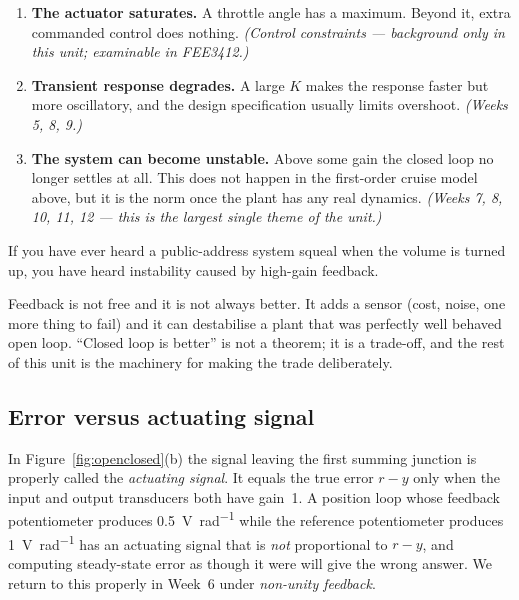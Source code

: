 \documentclass[11pt,a4paper]{article}
\begin{document}
\begin{enumerate}[leftmargin=*]
\item \textbf{The actuator saturates.} A throttle angle has a maximum. Beyond
      it, extra commanded control does nothing. \emph{(Control constraints ---
      background only in this unit; examinable in FEE3412.)}
\item \textbf{Transient response degrades.} A large $K$ makes the response
      faster but more oscillatory, and the design specification usually limits
      overshoot. \emph{(Weeks 5, 8, 9.)}
\item \textbf{The system can become unstable.} Above some gain the closed loop
      no longer settles at all. This does not happen in the first-order cruise
      model above, but it is the norm once the plant has any real dynamics.
      \emph{(Weeks 7, 8, 10, 11, 12 --- this is the largest single theme of the
      unit.)}
\end{enumerate}

If you have ever heard a public-address system squeal when the volume is turned
up, you have heard instability caused by high-gain feedback.

\begin{pitfall}
Feedback is not free and it is not always better. It adds a sensor (cost,
noise, one more thing to fail) and it can destabilise a plant that was
perfectly well behaved open loop. ``Closed loop is better'' is not a theorem;
it is a trade-off, and the rest of this unit is the machinery for making the
trade deliberately.
\end{pitfall}

\subsection{Error versus actuating signal}

In Figure~\ref{fig:openclosed}(b) the signal leaving the first summing junction
is properly called the \emph{actuating signal}. It equals the true error
$r-y$ only when the input and output transducers both have gain~1. A
position loop whose feedback potentiometer produces \SI{0.5}{\volt\per\radian}
while the reference potentiometer produces \SI{1}{\volt\per\radian} has an
actuating signal that is \emph{not} proportional to $r-y$, and computing
steady-state error as though it were will give the wrong answer. We return to
this properly in Week~6 under \emph{non-unity feedback}.

\end{document}
